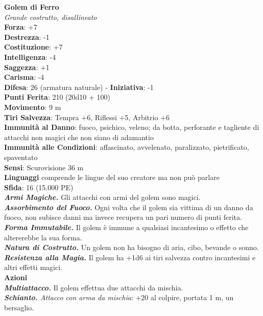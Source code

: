 \begin{multicols}{2}
\medskip\textbf{Golem di Ferro}\\
\emph{Grande costrutto, disallineato}\\
\textbf{Forza}: +7\\
\textbf{Destrezza}: -1\\
\textbf{Costituzione}: +7\\
\textbf{Intelligenza}: -4\\
\textbf{Saggezza}: +1\\
\textbf{Carisma}: -4\\
\textbf{Difesa}: 26 (armatura naturale) - \textbf{Iniziativa}: -1\\
\textbf{Punti Ferita}: 210 (20d10 + 100)\\
\textbf{Movimento}: 9 m\\
\textbf{Tiri Salvezza}: Tempra +6, Riflessi +5, Arbitrio +6\\
\textbf{Immunità al Danno}: fuoco, psichico, veleno; da botta, perforante e tagliente di attacchi non magici che non siano di adamantio\\
\textbf{Immunità alle Condizioni}: affascinato, avvelenato, paralizzato, pietrificato, spaventato\\
\textbf{Sensi}: Scurovisione 36 m\\
\textbf{Linguaggi} comprende le lingue del suo creatore ma non può parlare\\
\textbf{Sfida}: 16 (15.000 PE)\smallskip\\
\emph{\textbf{Armi Magiche.}} Gli attacchi con armi del golem sono magici.\\
\emph{\textbf{Assorbimento del Fuoco.}} Ogni volta che il golem sia vittima di un danno da fuoco, non subisce danni ma invece recupera un pari numero di punti ferita.\\
\emph{\textbf{Forma Immutabile.}} Il golem è immune a qualsiasi incantesimo o effetto che altererebbe la sua forma.\\
\emph{\textbf{Natura di Costrutto.}} Un golem non ha bisogno di aria, cibo, bevande o sonno.\\
\emph{\textbf{Resistenza alla Magia.}} Il golem ha +1d6 ai tiri salvezza contro incantesimi e altri effetti magici.\\
\smallskip\textbf{Azioni}\\
\emph{\textbf{Multiattacco.}} Il golem effettua due attacchi da mischia. \\
\emph{\textbf{Schianto.} Attacco con arma da mischia}: +20 al colpire, portata 1 m, un bersaglio.\\

\end{multicols}

